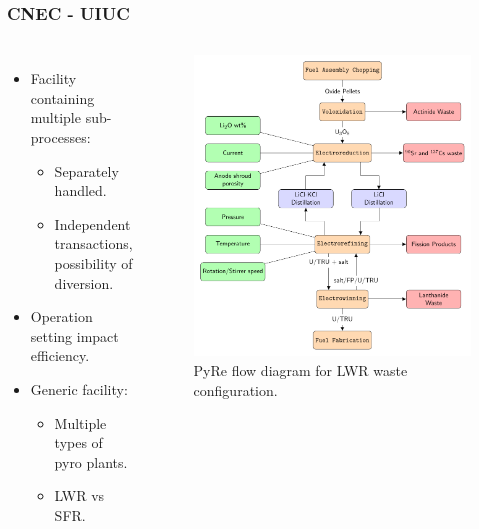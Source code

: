 \begin{frame}
\frametitle{CNEC - UIUC}
\begin{columns}
	\column[t]{5cm}
	\begin{itemize}
		\item Facility containing multiple sub-processes:
		\begin{itemize}
			\item Separately handled.
			\item Independent transactions, possibility of diversion.
		\end{itemize}
		\item Operation setting impact efficiency.
		\item Generic facility:
		\begin{itemize}
			\item Multiple types of pyro plants.
			\item LWR vs SFR.
		\end{itemize}
	\end{itemize}
	\column[t]{6cm}
	\begin{figure}
		\includegraphics[width=\linewidth]{./images/westphal-pyre.pdf}
		\caption{PyRe flow diagram for LWR waste configuration.}
		\label{fig:pyre}
	\end{figure}
\end{columns}
\end{frame}

